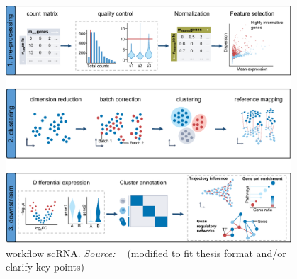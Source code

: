 \begin{figure}[!ht]
	\centering
	\includegraphics[width=0.95\textwidth]{workflow_scRNA/fig}
	\vspace{0.1cm}
	\caption[workflow\_scRNA.]{workflow scRNA. \emph{Source: ~\cite{heumos2023best}} (modified to fit thesis format and/or clarify key points)}
	\label{fig:workflow_scRNA}
\end{figure}

